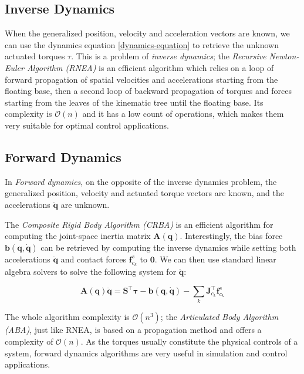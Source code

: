 \subsection{Inverse Dynamics}

When the generalized position, velocity and acceleration vectors are
known, we can use the dynamics equation \ref{dynamics-equation} to
retrieve the unknown actuated torques $\mathbb{\tau}$. This is a
problem of \emph{inverse dynamics}; the \emph{Recursive Newton-Euler
  Algorithm (RNEA)} is an efficient algorithm which relies on a loop
of forward propagation of spatial velocities and accelerations
starting from the floating base, then a second loop of backward
propagation of torques and forces starting from the leaves of the
kinematic tree until the floating base. Its complexity is
$\mathcal{O}(n)$ and it has a low count of operations, which makes
them very suitable for optimal control applications.

\subsection{Forward Dynamics}

In \emph{Forward dynamics}, on the opposite of the inverse dynamics
problem, the generalized position, velocity and actuated torque
vectors are known, and the accelerations $\ddot{\mathbf{q}}$ are
unknown.

The \emph{Composite Rigid Body Algorithm (CRBA)} is an efficient
algorithm for computing the joint-space inertia matrix
$\mathbf{A}(\mathbf{q})$. Interestingly, the bias force
$\mathbf{b}(\mathbf{q},\dot{\mathbf{q}})$ can be retrieved by computing the
inverse dynamics while setting both accelerations $\ddot{\mathbf{q}}$
and contact forces $\mathbf{f}^s_{c_k}$ to $\mathbf{0}$. We can then
use standard linear algebra solvers to solve the following system for
$\ddot{\mathbf{q}}$:

\begin{equation}
  \mathbf{A}(\mathbf{q})\ddot{\mathbf{q}} =
  \mathbf{S}^\top\boldsymbol{\tau} -
  \mathbf{b}(\mathbf{q},\dot{\mathbf{q}}) -
  \sum_k\mathbf{J}_{c_k}^\top\mathbf{f}^s_{c_k}
\end{equation}

The whole algorithm complexity is $\mathcal{O}(n^3)$; the
\emph{Articulated Body Algorithm (ABA)}, just like RNEA, is based on a
propagation method and offers a complexity of $\mathcal{O}(n)$. As the
torques usually constitute the physical controls of a system, forward
dynamics algorithms are very useful in simulation and control
applications.

